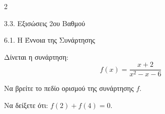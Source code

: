 \begin{ylh}{2}
    \item 3.3. Εξισώσεις 2ου Βαθμού
    \item 6.1. Η Έννοια της Συνάρτησης
\end{ylh}
Δίνεται η συνάρτηση: \[ f(x) = \dfrac{x + 2}{x^2 - x - 6} \]

\begin{alist}
\item Να βρείτε το πεδίο ορισμού της συνάρτησης $f$.
\item Να δείξετε ότι: $f(2) + f(4) = 0$.
\end{alist}

